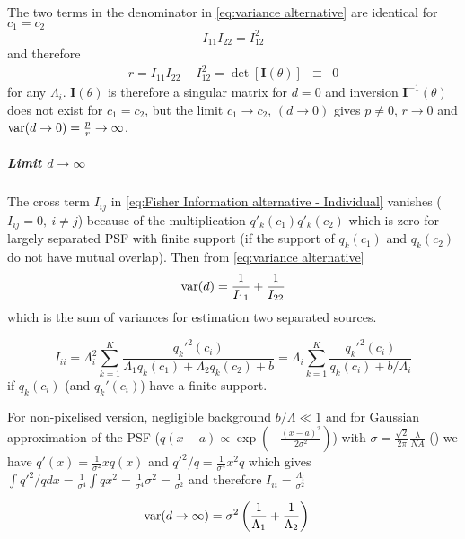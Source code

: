 The two terms in the denominator in \autoref{eq:variance alternative} are identical for $c_1=c_2$
\begin{equation}
	I_{11}I_{22}=I_{12}^2
\end{equation}
%
and therefore 
%
\begin{eqnarray*}
	r=I_{11}I_{22}-I_{12}^2=\det\left[\bm{I}(\theta)\right] & \equiv & 0
\end{eqnarray*}
%
for any $\Lambda_i$. $\bm{I}(\theta)$ is therefore a singular matrix for $d=0$ and inversion $\bm{I}^{-1}(\theta)$ does not exist for $c_1=c_2$, but the limit $c_1\rightarrow c_2,\,(d\rightarrow0)$ gives $p\neq0,\, r\rightarrow0$ and $\mathrm{var}(d\rightarrow0)=\frac{p}{r}\rightarrow\infty$. 

\subparagraph*{Limit $d\rightarrow\infty$}
The cross term $I_{ij}$ in \autoref{eq:Fisher Information alternative - Individual} vanishes ($I_{ij}=0,\: i\neq j$) because of the multiplication $q'_k(c_1)q'_k(c_2)$ which is zero for largely separated PSF with finite support (if the support of $q_k(c_1)$ and $q_k(c_2)$ do not have mutual overlap). Then from \autoref{eq:variance alternative} 
%
\begin{equation}
	\mathrm{var}(d)=\frac{1}{I_{11}}+\frac{1}{I_{22}}
\end{equation}
%
which is the sum of variances for estimation two separated sources.

\begin{equation}
	I_{ii}=\Lambda_i^2\sum_{k=1}^K\frac{q_k'^2(c_i)}{\Lambda_1q_k(c_1)+\Lambda_2q_k(c_2)+b}=\Lambda_i\sum_{k=1}^K\frac{q_k'^2(c_i)}{q_k(c_i)+b/\Lambda_i}
\end{equation}
%
if $q_k(c_i)$ (and $q_k'(c_i)$) have a finite support.

For non-pixelised version, negligible background $b/\Lambda\ll1$ and for Gaussian approximation of the PSF ($q(x-a)\propto\exp\left(-\frac{(x-a)^2}{2\sigma^2}\right)$) with
$\sigma=\frac{\sqrt{2}}{2\pi}\frac{\lambda}{NA}$ (\cite{Zhang2007}) we have $q'(x)=\frac{1}{\sigma^2}xq(x)$ and $q'^2/q=\frac{1}{\sigma^4}x^2q$ which gives $\int q'^2/qdx=\frac{1}{\sigma^4}\int qx^2=\frac{1}{\sigma^4}\sigma^2=\frac{1}{\sigma^2}$ and therefore $I_{ii}=\frac{\Lambda_i}{\sigma^2}$ 

\begin{alignat*}{1}
	\mathrm{var}(d\rightarrow\infty) & =\sigma^2\left(\frac{1}{\Lambda_1}+\frac{1}{\Lambda_2}\right)
\end{alignat*}

